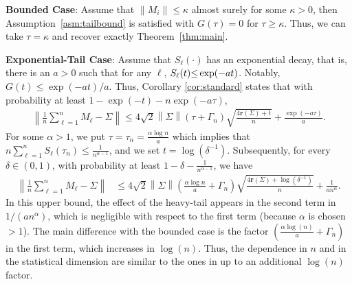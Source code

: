 \documentclass[11pt,a4paper]{article}
\theoremstyle{remark}
\theoremstyle{definition}
\newcommand{\bc}{c}
\newcommand{\bm}{m}
\theoremstyle{definition}
\newcommand{\Surv}{S}
\newcommand{\rc}{\color{black}}
\begin{document}
\begin{bibunit}[apalike]
\textbf{Bounded Case}: Assume that $\|M_i\|\leq \kappa$ almost surely for some $\kappa > 0$, then Assumption~\ref{asm:tailbound} is satisfied with $G(\tau) =0 $ for $\tau\geq \kappa$. 
Thus, we can take $\tau=\kappa$ and recover exactly Theorem~\ref{thm:main}.

\textbf{Exponential-Tail Case}: Assume that $\Surv_\ell(\cdot)$ has an exponential decay, that is, there is an $a>0$ such that for any $\ell$, $\Surv_\ell(t) {\rc\le} \exp(- a t) $. Notably, $G(t) \leq  \exp(- a t)/a $.
Thus, Corollary \ref{cor:standard} states that with probability at least $1-\exp(-t)-n  \exp(-a \tau) $,
    \begin{align*}
    \left\|\frac{1}{n}\sum_{\ell=1}^{n} M_{\ell}-\Sigma\right\|\le  4\sqrt{2}\left\|\Sigma\right\|\left( \tau+\Gamma_{n}\right)\sqrt{\frac{4\mathbf{r}\left(\Sigma\right)+t}{n}} + \frac{\exp\left( - a \tau \right)}{a}.
\end{align*}
For some $\alpha>1$, we put $\tau = \tau_n = \frac{\alpha \log n}{a}$ which implies that $n \sum_{\ell=1}^n \Surv_\ell(\tau_n) \leq \frac{1}{n^{\alpha-1}} $, and we set $t = \log ( \delta^{-1})$.
Subsequently, for every $\delta \in (0,1)$, with probability at least $1-\delta-\frac{1}{n^{\alpha-1}}$, we have
    \begin{align*}
        \left\|\frac{1}{n}\sum_{\ell=1}^{n} M_{\ell}-\Sigma\right\|
    &\le 4\sqrt{2}\left\|\Sigma\right\|\left( \frac{\alpha \log n }{a}+\Gamma_{n}\right)\sqrt{\frac{4\mathbf{r}\left(\Sigma\right)+\log (\delta^{-1})}{n}}  + \frac{1}{a n^{\alpha}} .
\end{align*}
In this upper bound, the effect of the heavy-tail appears in the second term in $1/(an^\alpha)$, which is negligible {\rc with respect to} the first term (because $\alpha$ is chosen $>1$). The main difference with the bounded case
 is the factor $( \frac{\alpha \log(n)}{a} + \Gamma_{n})$ in the first term, which increases in $\log(n)$. Thus, the dependence in $n$ and in the statistical dimension are similar to the ones in \citep{koltchinskii2017concentration,zhivotovskiy2021dimension} up to an additional $\log(n)$ factor.




\end{bibunit}
\end{document}
